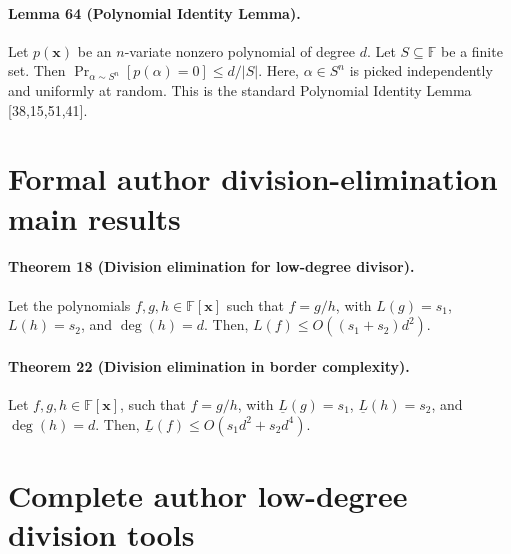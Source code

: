\documentclass[10pt,a4paper]{article}
\begin{document}
\paragraph{Lemma 64 (Polynomial Identity Lemma).} Let $p(\mathbf x)$ be an $n$-variate nonzero polynomial of degree $d$. Let $S\subseteq\mathbb F$ be a finite set. Then $\Pr_{\alpha\sim S^n}[p(\alpha)=0]\le d/|S|$. Here, $\alpha\in S^n$ is picked independently and uniformly at random. This is the standard Polynomial Identity Lemma [38,15,51,41].

\section*{Formal author division-elimination main results}
\paragraph{Theorem 18 (Division elimination for low-degree divisor).} Let the polynomials $f,g,h\in\mathbb F[\mathbf x]$ such that $f=g/h$, with $L(g)=s_1$, $L(h)=s_2$, and $\deg(h)=d$. Then, $L(f)\le O((s_1+s_2)d^2)$.
\paragraph{Theorem 22 (Division elimination in border complexity).} Let $f,g,h\in\mathbb F[\mathbf x]$, such that $f=g/h$, with $\underline L(g)=s_1$, $\underline L(h)=s_2$, and $\deg(h)=d$. Then, $\underline L(f)\le O(s_1d^2+s_2d^4)$.

\section*{Complete author low-degree division tools}
\end{document}

